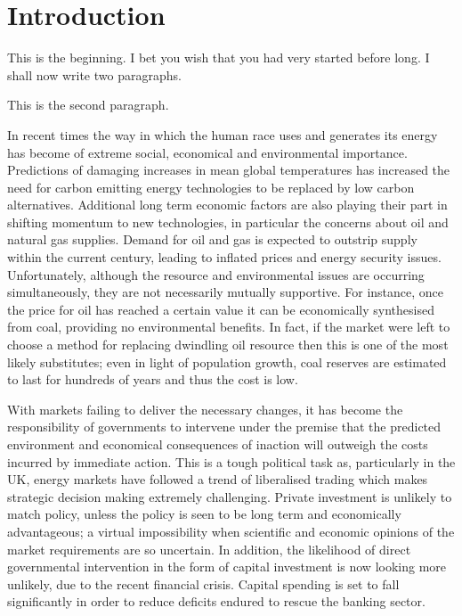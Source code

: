 \chapter*{Introduction}

This is the beginning. I bet you wish that you had very started before long. I
shall now write two paragraphs.

This is the second paragraph.

In recent times the way in which the human race uses and generates its energy
has become of extreme
social, economical and environmental importance. Predictions of damaging
increases in mean global
temperatures \citep[see][]{Solomon:2007:CUP} has increased the need for carbon
emitting energy
technologies to be replaced by low carbon alternatives. Additional long term
economic factors are
also playing their part in shifting momentum to new technologies, in particular
the concerns about
oil and natural gas supplies. Demand for oil and gas is expected to outstrip
supply within the
current century, leading to inflated prices and energy security issues.
Unfortunately, although the
resource and environmental issues are occurring simultaneously, they are not
necessarily mutually
supportive. For instance, once the price for oil has reached a certain value it
can be economically
synthesised from coal, providing no environmental benefits. In fact, if the
market were left to
choose a method for replacing dwindling oil resource then this is one of the
most likely
substitutes; even in light of population growth, coal reserves are estimated to
last for hundreds of
years \citep[see][]{Jaccard:2005:CUP} and thus the cost is low.

With markets failing to deliver the necessary changes, it has become the
responsibility of
governments to intervene under the premise that the predicted environment and
economical
consequences of inaction will outweigh the costs incurred by immediate action.
This is a tough
political task as, particularly in the UK, energy markets have followed a trend
of liberalised
trading which makes strategic decision making extremely challenging. Private
investment is unlikely
to match policy, unless the policy is seen to be long term and economically
advantageous; a virtual
impossibility when scientific and economic opinions of the market requirements
are so uncertain. In
addition, the likelihood of direct governmental intervention in the form of
capital investment is
now looking more unlikely, due to the recent financial crisis. Capital spending
is set to fall
significantly in order to reduce deficits endured to rescue the banking sector.

